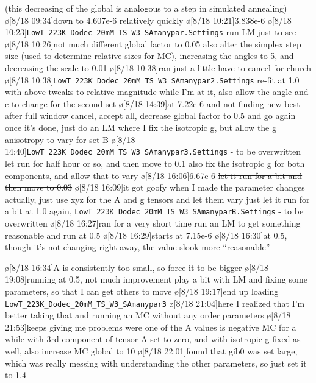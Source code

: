 \begin{err}
    (this decreasing of the global is analogous to a step in simulated annealing)
    \o[8/18 09:34]{down to 4.607e-6 relatively quickly}
    \o[8/18 10:21]{3.838e-6}
    \o[8/18 10:23]{\texttt{LowT_223K_Dodec_20mM_TS_W3_SAmanypar.Settings}}
    run LM just to see
    \o[8/18 10:26]{not much different}
    global factor to 0.05
    also alter the simplex step size (used to determine relative sizes for MC), increasing the angles to 5, and decreasing the scale to 0.01
    \o[8/18 10:38]{ran just a little}
    have to cancel for church
    \o[8/18 10:38]{\texttt{LowT_223K_Dodec_20mM_TS_W3_SAmanypar2.Settings}}
    re-fit at 1.0 with above tweaks to relative magnitude
    while I'm at it, also allow the angle and c to change for the second set
    \o[8/18 14:39]{at 7.22e-6 and not finding new best after full window}
    cancel, accept all,
    decrease global factor to 0.5 and go again
    once it's done, just do an LM where I fix the isotropic g, but allow the g anisotropy to vary for set B
    \o[8/18 14:40]{\texttt{LowT_223K_Dodec_20mM_TS_W3_SAmanypar3.Settings} - to be overwritten}
    let run for half hour or so, and then move to 0.1
    also fix the isotropic g for both components, and allow that to vary
    \o[8/18 16:06]{6.67e-6}
    \sout{let it run for a bit and then move to 0.03}
    \o[8/18 16:09]{it got goofy when I made the parameter changes}
    actually, just use xyz for the A and g tensors and let them vary
    just let it run for a bit at 1.0 again,
    \texttt{LowT_223K_Dodec_20mM_TS_W3_SAmanyparB.Settings} - to be overwritten
    \o[8/18 16:27]{ran for a very short time}
    run an LM to get something reasonable
    and run at 0.5
    \o[8/18 16:29]{starts at 7.15e-6}
    \o[8/18 16:30]{at 0.5, though it's not changing right away, the value slook more ``reasonable''}
    \begin{err}
        \o[8/18 16:34]{A is consistently too small, so} force it to be bigger
        \o[8/18 19:08]{running at 0.5, not much improvement}
        play a bit with LM and fixing some parameters, so that I can get others to move
        \o[8/18 19:17]{end up loading \texttt{LowT_223K_Dodec_20mM_TS_W3_SAmanypar3}}
        \o[8/18 21:04]{here I realized that I'm better taking that and running an MC without any order parameters}
        \o[8/18 21:53]{keeps giving me problems were one of the A values is negative}
        MC for a while with 3rd component of tensor A set to zero, and with isotropic g fixed as well, also increase MC global to 10
        \o[8/18 22:01]{found that gib0 was set large, which was really messing with understanding the other parameters, so} just set it to 1.4

\end{err}
\end{err}
